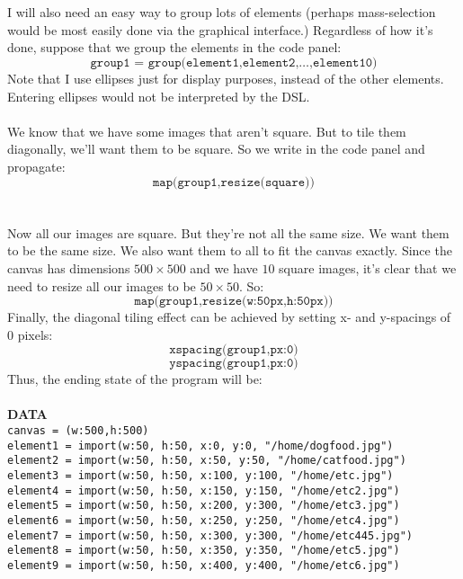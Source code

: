 \documentclass[12pt]{article}
\theoremstyle{remark}
\newcommand{\ttt}[1]{\texttt{#1}}
\begin{document}
\begin{section}
\\\\
I will also need an easy way to group lots of elements (perhaps mass-selection would be most easily done via the graphical interface.) Regardless of how it's done, suppose that we group the elements in the code panel:
$$\ttt{group1 = group(element1,element2,\ldots,element10)}$$
Note that I use ellipses just for display purposes, instead of the other elements. Entering ellipses would not be interpreted by the DSL.
\\\\
We know that we have some images that aren't square. But to tile them diagonally, we'll want them to be square. So we write in the code panel and propagate:
$$\ttt{map(group1,resize(square))}$$
\\\\
Now all our images are square. But they're not all the same size. We want them to be the same size. We also want them to all to fit the canvas exactly. Since the canvas has dimensions $500 \times 500$ and we have $10$ square images, it's clear that we need to resize all our images to be $50\times 50$. So:
$$\ttt{map(group1,resize(w:50px,h:50px))}$$
Finally, the diagonal tiling effect can be achieved by setting x- and y-spacings of $0$ pixels:
$$\ttt{xspacing(group1,px:0)}$$$$\ttt{yspacing(group1,px:0)}$$
Thus, the ending state of the program will be:\\\\
\textbf{DATA}\\
\ttt{canvas = (w:500,h:500)}
\\
\ttt{element1 = import(w:50, h:50, x:0, y:0, "/home/dogfood.jpg")}\\
\ttt{element2 = import(w:50, h:50, x:50, y:50, "/home/catfood.jpg")}\\
\ttt{element3 = import(w:50, h:50, x:100, y:100, "/home/etc.jpg")}\\
\ttt{element4 = import(w:50, h:50, x:150, y:150, "/home/etc2.jpg")}\\
\ttt{element5 = import(w:50, h:50, x:200, y:300, "/home/etc3.jpg")}\\
\ttt{element6 = import(w:50, h:50, x:250, y:250, "/home/etc4.jpg")}\\
\ttt{element7 = import(w:50, h:50, x:300, y:300, "/home/etc445.jpg")}\\
\ttt{element8 = import(w:50, h:50, x:350, y:350, "/home/etc5.jpg")}\\
\ttt{element9 = import(w:50, h:50, x:400, y:400, "/home/etc6.jpg")}\\

\end{section}
\end{document}
